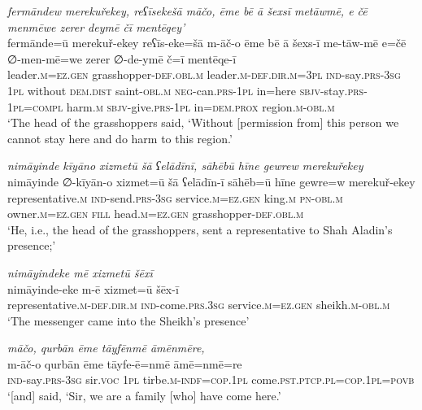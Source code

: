 \ea \label{PM.5}
\textit{fermāndew merekuřekey, reʕīsekešā māčo, ēme bē ā šexsī metāwmē, e čē menmēwe zerer deymē čī mentēqey’} \\ 
\gll fermānde=ū merekuř-ekey reʕīs-eke=šā m-āč-o ēme bē ā šexs-ī me-tāw-mē e=čē ∅-men-mē=we zerer ∅-de-ymē č=ī mentēqe-ī \\ 
 leader\textsc{.m}\textsc{\textsc{=ez.gen}} grasshopper\textsc{-def}\textsc{.obl}\textsc{.m} leader\textsc{.m}\textsc{-def}\textsc{.dir}\textsc{.m}\textsc{=3pl} \textsc{ind-}say\textsc{.prs}\textsc{-3sg} \textsc{1pl} without \textsc{dem.dist} saint\textsc{-obl}\textsc{.m} \textsc{neg-}can\textsc{.prs}\textsc{-1pl} in=here \textsc{sbjv-}stay\textsc{.prs}\textsc{-1pl}\textsc{=compl} harm\textsc{.m} \textsc{sbjv-}give\textsc{.prs}-\textsc{1pl} in=\textsc{dem.prox} region\textsc{.m}\textsc{-obl}\textsc{.m} \\ 
\glt `The head of the grasshoppers said, ‘Without [permission from] this person we cannot stay here and do harm to this region.'
\z 
 
\ea \label{PM.6}
\textit{nimāyinde kīyāno xizmetū šā ʕelādīnī, sāhēbū hīne gewrew merekuřekey} \\ 
\gll nimāyinde ∅-kīyān-o xizmet=ū šā ʕelādīn-ī sāhēb=ū hīne gewre=w merekuř-ekey \\ 
 representative\textsc{.m} \textsc{ind-}send\textsc{.prs}\textsc{-3sg} service\textsc{.m}\textsc{\textsc{=ez.gen}} king\textsc{.m} \textsc{pn}\textsc{-obl}\textsc{.m} owner\textsc{.m}\textsc{\textsc{=ez.gen}} \textsc{fill} head\textsc{.m}\textsc{\textsc{=ez.gen}} grasshopper\textsc{-def}\textsc{.obl}\textsc{.m} \\ 
\glt `He, i.e., the head of the grasshoppers, sent a representative to Shah Aladin’s presence;'
\z 
 
\ea \label{PM.10}
\textit{nimāyindeke mē xizmetū šēxī} \\ 
\gll nimāyinde-eke m-ē xizmet=ū šēx-ī \\ 
 representative\textsc{.m}\textsc{-def}\textsc{.dir}\textsc{.m} \textsc{ind-}come\textsc{.prs}\textsc{.3sg} service\textsc{.m}\textsc{\textsc{=ez.gen}} sheikh\textsc{.m}\textsc{-obl}\textsc{.m} \\ 
\glt `The messenger came into the Sheikh’s presence'
\z 
 
\ea \label{PM.11}
\textit{māčo, qurbān ēme tāyfēnmē āmēnmēre,} \\ 
\gll m-āč-o qurbān ēme tāyfe-ē=nmē āmē=nmē=re \\ 
 \textsc{ind-}say\textsc{.prs}\textsc{-3sg} sir.\textsc{voc} \textsc{1pl} tirbe\textsc{.m}\textsc{-indf}\textsc{=cop}\textsc{.1pl} come\textsc{.pst}\textsc{.ptcp}\textsc{.pl}\textsc{=cop}\textsc{.1pl}\textsc{=\textsc{povb}} \\ 
\glt `[and] said, ‘Sir, we are a family [who] have come here.'
\z 
 
